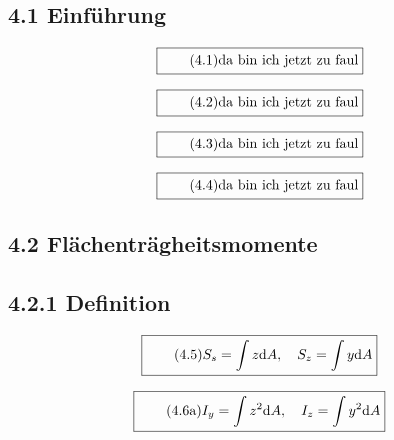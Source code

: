 \documentclass[11pt]{article}
\newcommand{\1}{ {\mathds{1}} }
\begin{document}
    \subsection*{4.1 Einführung}

    \begin{equation}
      \boxed{
        \tag{4.1}
        \begin{split}
          \text{da bin ich jetzt zu faul}
        \end{split}
      }
    \end{equation}

    \begin{equation}
      \boxed{
        \tag{4.2}
        \begin{split}
          \text{da bin ich jetzt zu faul}
        \end{split}
      }
    \end{equation}

        \begin{equation}
      \boxed{
        \tag{4.3}
        \begin{split}
          \text{da bin ich jetzt zu faul}
        \end{split}
      }
    \end{equation}

            \begin{equation}
      \boxed{
        \tag{4.4}
        \begin{split}
          \text{da bin ich jetzt zu faul}
        \end{split}
      }
    \end{equation}

    \subsection*{4.2 Flächenträgheitsmomente}
    \subsection*{4.2.1 Definition}

    \begin{equation}
      \boxed{
        \tag{4.5}
        \begin{split}
          S_s
          =
          \int z \text{d} A, \quad
          S_z
          =
          \int y \text{d} A
        \end{split}
      }
    \end{equation}

    \begin{equation}
      \boxed{
        \tag{4.6a}
        \begin{split}
          I_y
          =
          \int
          z^2\text{d}A, \quad
          I_z
          =
          \int
          y^2\text{d}A
        \end{split}
      }
    \end{equation}
    
\end{document}
